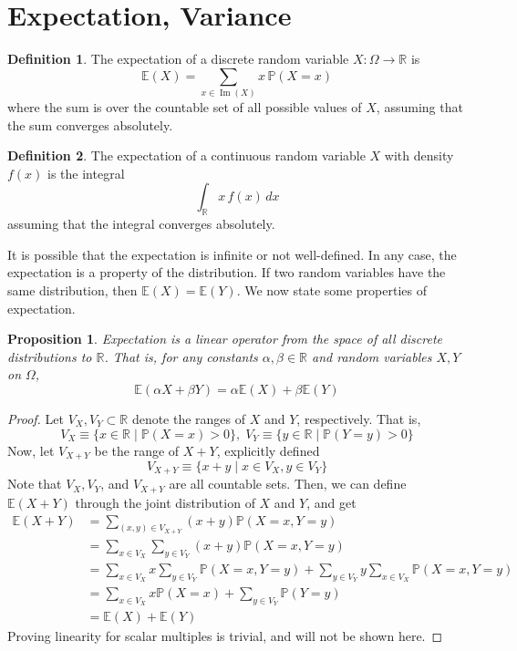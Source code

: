 \documentclass{article}
\DeclareMathOperator{\im}{Im}
\newtheorem{proposition}[theorem]{Proposition}
\theoremstyle{remark}
\theoremstyle{definition}
\newtheorem{definition}{Definition}[section]
\begin{document}
\section{Expectation, Variance} 
\begin{definition}
The expectation of a discrete random variable $X: \Omega \longrightarrow \mathbb{R}$ is 
\[\mathbb{E}(X) = \sum_{x \in \im(X)} x \, \mathbb{P}(X = x)\]
where the sum is over the countable set of all possible values of $X$, assuming that the sum converges absolutely. 
\end{definition}

\begin{definition}
The expectation of a continuous random variable $X$ with density $f(x)$ is the integral 
\[\int_\mathbb{R} x \, f(x) \, dx\]
assuming that the integral converges absolutely. 
\end{definition}

It is possible that the expectation is infinite or not well-defined. In any case, the expectation is a property of the distribution. If two random variables have the same distribution, then $\mathbb{E}(X) = \mathbb{E}(Y)$. We now state some properties of expectation. 

\begin{proposition}
Expectation is a linear operator from the space of all discrete distributions to $\mathbb{R}$. That is, for any constants $\alpha, \beta \in \mathbb{R}$ and random variables $X, Y$ on $\Omega$, 
    \[\mathbb{E}(\alpha X + \beta Y) = \alpha \mathbb{E}(X) + \beta \mathbb{E}(Y)\] 
\end{proposition}
\begin{proof}
Let $V_X, V_Y \subset \mathbb{R}$ denote the ranges of $X$ and $Y$, respectively. That is, 
\[V_X \equiv \{x \in \mathbb{R} \; | \; \mathbb{P}(X =x) >0\}, \; V_Y \equiv \{y \in \mathbb{R} \; | \; \mathbb{P}(Y =y) > 0\}\]
Now, let $V_{X+Y}$ be the range of $X+Y$, explicitly defined
\[V_{X+Y} \equiv \{x+y \; | \; x \in V_X, y \in V_Y\}\]
Note that $V_X, V_Y$, and $V_{X+Y}$ are all countable sets. Then, we can define $\mathbb{E}(X+Y)$ through the joint distribution of $X$ and $Y$, and get
\begin{align*}
    \mathbb{E}(X+Y) & = \sum_{(x,y) \in V_{X+Y}} (x+y) \mathbb{P} (X=x, Y=y) \\
    & = \sum_{x \in V_X} \sum_{y \in V_Y} (x+y) \mathbb{P} (X=x, Y=y) \\
    & = \sum_{x \in V_X} x \sum_{y \in V_Y} \mathbb{P} (X=x, Y=y) + \sum_{y \in V_Y} y \sum_{x \in V_X} \mathbb{P} (X=x, Y=y) \\
    & = \sum_{x \in V_X} x \mathbb{P}(X=x) + \sum_{y \in V_Y} \mathbb{P}(Y=y) \\
    & = \mathbb{E}(X) + \mathbb{E}(Y)
\end{align*}
Proving linearity for scalar multiples is trivial, and will not be shown here. 
\end{proof}
\end{document}
